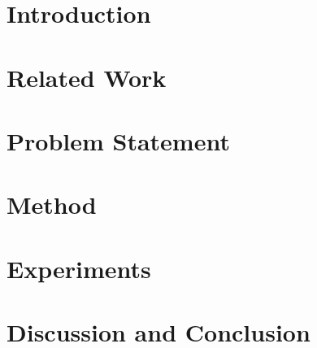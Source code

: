 \documentclass[letterpaper, 10 pt, conference]{ieeeconf}
\author{Anonymous Authors}
\begin{document}
\maketitle
\thispagestyle{empty}
\pagestyle{empty}

\begin{abstract}

\end{abstract}

\section{Introduction}
\label{sec:introduction}


\section{Related Work}
\label{sec:related-work}


\section{Problem Statement}
\label{sec:problem-statement}


\section{Method}
\label{sec:method}


\section{Experiments}
\label{sec:experiments}


\section{Discussion and Conclusion}
\label{sec:conclusion}




\end{document}
